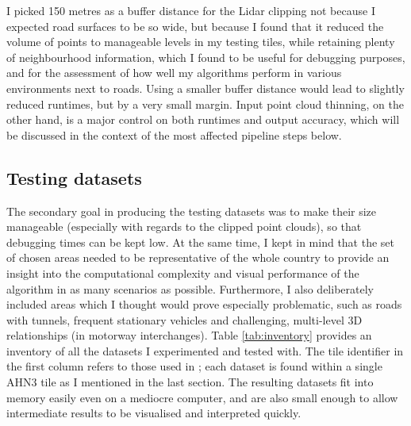 I picked 150 metres as a buffer distance for the Lidar clipping not because I expected road surfaces to be so wide, but because I found that it reduced the volume of points to manageable levels in my testing tiles, while retaining plenty of neighbourhood information, which I found to be useful for debugging purposes, and for the assessment of how well my algorithms perform in various environments next to roads. Using a smaller buffer distance would lead to slightly reduced runtimes, but by a very small margin. Input point cloud thinning, on the other hand, is a major control on both runtimes and output accuracy, which will be discussed in the context of the most affected pipeline steps below.

\subsection{Testing datasets}
\label{sub:testingdata}

The secondary goal in producing the testing datasets was to make their size manageable (especially with regards to the clipped point clouds), so that debugging times can be kept low. At the same time, I kept in mind that the set of chosen areas needed to be representative of the whole country to provide an insight into the computational complexity and visual performance of the algorithm in as many scenarios as possible. Furthermore, I also deliberately included areas which I thought would prove especially problematic, such as roads with tunnels, frequent stationary vehicles and challenging, multi-level 3D relationships (in motorway interchanges). Table \ref{tab:inventory} provides an inventory of all the datasets I experimented and tested with. The tile identifier in the first column refers to those used in \cite{ahn3_download}; each dataset is found within a single AHN3 tile as I mentioned in the last section. The resulting datasets fit into memory easily even on a mediocre computer, and are also small enough to allow intermediate results to be visualised and interpreted quickly.

